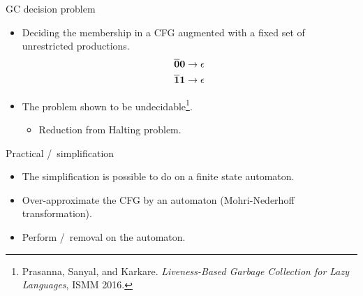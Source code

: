 \begin{frame}{GC decision problem}

\begin{itemize}
\item Deciding the
  membership in  a CFG augmented  with a
  fixed set of unrestricted productions.
  \begin{align*}
    \overline{\mathbf{0}}\mathbf{0}    \rightarrow    \epsilon\\
    \overline{\mathbf{1}}\mathbf{1}    \rightarrow   \epsilon\\
  \end{align*}
\item The problem shown to be undecidable\footnote{ Prasanna, Sanyal, and Karkare. {\em Liveness-Based Garbage Collection for Lazy Languages}, ISMM 2016.}.
  \begin{itemize}
  \item Reduction from Halting problem.
  \end{itemize}
\end{itemize}
\end{frame}
\begin{frame}{Practical \bcar/\bcdr\  simplification}

\begin{itemize}
\item The simplification is possible to do on a finite state automaton.
\item Over-approximate the CFG by an automaton
  (Mohri-Nederhoff transformation).
\item Perform \acar/\acdr\ removal on the automaton.
\end{itemize}

\end{frame}

